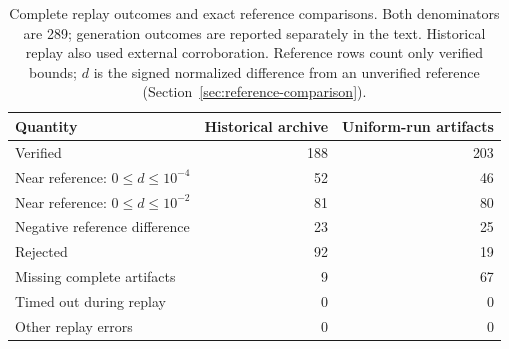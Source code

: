 \begin{table}[tb]
\centering
\caption{Complete replay outcomes and exact reference comparisons. Both denominators are 289; generation outcomes are reported separately in the text. Historical replay also used external corroboration. Reference rows count only verified bounds; $d$ is the signed normalized difference from an unverified reference (Section~\ref{sec:reference-comparison}).}
\label{tab:campaign-results}
\begin{tabular}{lrr}
\toprule
Quantity & Historical archive & Uniform-run artifacts \\
\midrule
Verified & 188 & 203 \\
Near reference: $0\le d\le10^{-4}$ & 52 & 46 \\
Near reference: $0\le d\le10^{-2}$ & 81 & 80 \\
Negative reference difference & 23 & 25 \\
Rejected & 92 & 19 \\
Missing complete artifacts & 9 & 67 \\
Timed out during replay & 0 & 0 \\
Other replay errors & 0 & 0 \\
\bottomrule
\end{tabular}
\end{table}
